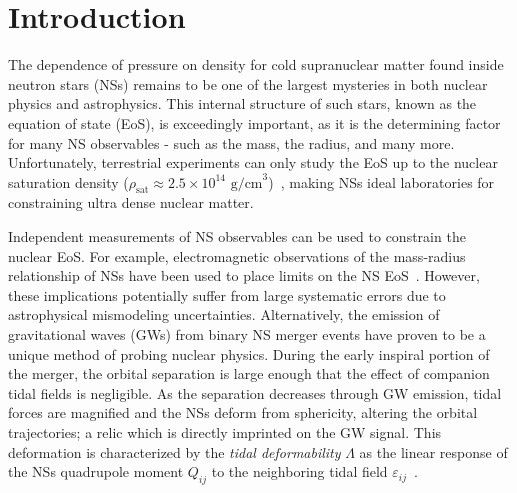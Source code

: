 \documentclass[prd,twocolumn,nofootinbib,superscriptaddress,amsmath,amssymb]{revtex4-1}
\begin{document}
\maketitle


\section{Introduction}\label{sec:intro}
The dependence of pressure on density for cold supranuclear matter found inside neutron stars (NSs) remains to be one of the largest mysteries in both nuclear physics and astrophysics.
This internal structure of such stars, known as the equation of state (EoS), is exceedingly important, as it is the determining factor for many NS observables - such as the mass, the radius, and many more.
Unfortunately, terrestrial experiments can only study the EoS up to the nuclear saturation density ($\rho_{\text{sat}} \approx 2.5 \times 10^{14} \text{ g/cm}^3$)~\cite{Li:HeavyIon,Tsang:SymmetryEnergy,Centelles:NeutronSkin,Li:CrossSections,Chen:SymEnergy}, making NSs ideal laboratories for constraining ultra dense nuclear matter.

Independent measurements of NS observables can be used to constrain the nuclear EoS.
For example, electromagnetic observations of the mass-radius relationship of NSs have been used to place limits on the NS EoS~\cite{guver,ozel-baym-guver,steiner-lattimer-brown,Lattimer2014,Ozel:2016oaf}.
However, these implications potentially suffer from large systematic errors due to astrophysical mismodeling uncertainties.
Alternatively, the emission of gravitational waves (GWs) from binary NS merger events have proven to be a unique method of probing nuclear physics.
During the early inspiral portion of the merger, the orbital separation is large enough that the effect of companion tidal fields is negligible. 
As the separation decreases through GW emission, tidal forces are magnified and the NSs deform from sphericity, altering the orbital trajectories; a relic which is directly imprinted on the GW signal.
This deformation is characterized by the \textit{tidal deformability} $\Lambda$ as the linear response of the NSs quadrupole moment $Q_{ij}$ to the neighboring tidal field $\varepsilon_{ij}$~\cite{hinderer-love,Flanagan2008}.
\end{document}
